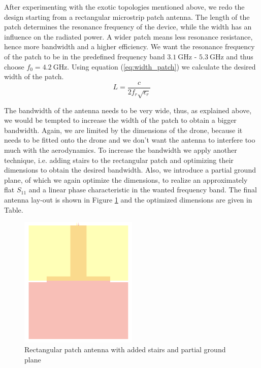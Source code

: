 \documentclass[a4paper]{article}        %
\begin{document}
	After experimenting with the exotic topologies mentioned above, we redo the design starting from a rectangular microstrip patch antenna. The length of the patch determines the resonance frequency of the device, while the width has an influence on the radiated power. A wider patch means less resonance resistance, hence more bandwidth and a higher efficiency. 
	We want the resonance frequency of the patch to be in the predefined frequency band $\SI{3.1}{\giga\hertz}$ - $\SI{5.3}{\giga\hertz}$ and thus choose $f_0 = \SI{4.2}{\giga\hertz}$. Using equation (\ref{eq:width_patch}) we calculate the desired width of the patch.
	\begin{equation} 
	L = \frac{c}{2 f_r \sqrt{\epsilon_r}}
	\label{eq:width_patch}
	\end{equation}

	The bandwidth of the antenna needs to be very wide, thus, as explained above, we would be tempted to increase the width of the patch to obtain a bigger bandwidth. Again, we are limited by the dimensions of the drone, because it needs to be fitted onto the drone and we don't want the antenna to interfere too much with the aerodynamics. To increase the bandwidth we apply another technique, i.e. adding stairs to the rectangular patch and optimizing their dimensions to obtain the desired bandwidth. Also, we introduce a partial ground plane, of which we again optimize the dimensions, to realize an approximately flat $S_{11}$ and a linear phase characteristic in the wanted frequency band. The final antenna lay-out is shown in Figure \ref{fig:patch_stairs} and the optimized dimensions are given in Table.

	\begin{figure}[H]
	\centering
		\includegraphics[width=0.5\textwidth]{images/antenna/patch_stairs.png}
		\caption{Rectangular patch antenna with added stairs and partial ground plane}
		\label{fig:patch_stairs}
	\end{figure}
\end{document}
